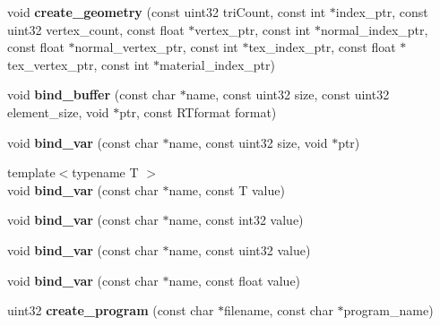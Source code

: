 \begin{DoxyCompactItemize}
\item 
\mbox{\label{struct_r_t_context_a67eec7e6a6c1691ef2173b0602360cf1}} 
void {\bfseries create\+\_\+geometry} (const uint32 tri\+Count, const int $\ast$index\+\_\+ptr, const uint32 vertex\+\_\+count, const float $\ast$vertex\+\_\+ptr, const int $\ast$normal\+\_\+index\+\_\+ptr, const float $\ast$normal\+\_\+vertex\+\_\+ptr, const int $\ast$tex\+\_\+index\+\_\+ptr, const float $\ast$tex\+\_\+vertex\+\_\+ptr, const int $\ast$material\+\_\+index\+\_\+ptr)
\item 
\mbox{\label{struct_r_t_context_a05d3b467a1705ac6f3da45a63da6a309}} 
void {\bfseries bind\+\_\+buffer} (const char $\ast$name, const uint32 size, const uint32 element\+\_\+size, void $\ast$ptr, const R\+Tformat format)
\item 
\mbox{\label{struct_r_t_context_ab6412d7924c5ee72f7859ce718ea8bec}} 
void {\bfseries bind\+\_\+var} (const char $\ast$name, const uint32 size, void $\ast$ptr)
\item 
\mbox{\label{struct_r_t_context_a008bde2ae8eef725707e91d11fc93696}} 
{\footnotesize template$<$typename T $>$ }\\void {\bfseries bind\+\_\+var} (const char $\ast$name, const T value)
\item 
\mbox{\label{struct_r_t_context_acdad4554bdc4abeb577147510be6b2e4}} 
void {\bfseries bind\+\_\+var} (const char $\ast$name, const int32 value)
\item 
\mbox{\label{struct_r_t_context_a103a415805b52765be25addf223eb9ea}} 
void {\bfseries bind\+\_\+var} (const char $\ast$name, const uint32 value)
\item 
\mbox{\label{struct_r_t_context_a2aef7cd0103ef1ca0920ecfc6a5248dc}} 
void {\bfseries bind\+\_\+var} (const char $\ast$name, const float value)
\item 
\mbox{\label{struct_r_t_context_aa3a4efba759b17aaf41421b5751c793b}} 
uint32 {\bfseries create\+\_\+program} (const char $\ast$filename, const char $\ast$program\+\_\+name)

\end{DoxyCompactItemize}
